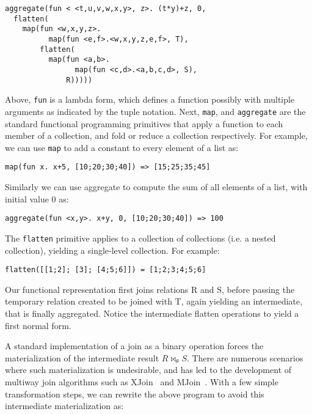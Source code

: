 \begin{verbatim}
aggregate(fun < <t,u,v,w,x,y>, z>. (t*y)+z, 0,
  flatten(
    map(fun <w,x,y,z>.
          map(fun <e,f>.<w,x,y,z,e,f>, T),
        flatten(
          map(fun <a,b>.
                map(fun <c,d>.<a,b,c,d>, S),
              R)))))
\end{verbatim}

\noindent Above, {\tt fun} is a lambda form, which defines a function possibly
with multiple arguments as indicated by the tuple notation. Next, {\tt map}, and
{\tt aggregate} are the standard functional programming primitives that apply a
function to each member of a collection, and fold or reduce a collection
respectively. For example, we can use {\tt map} to add a constant to every
element of a list as:

\vspace{-2mm}
\begin{verbatim}
map(fun x. x+5, [10;20;30;40]) => [15;25;35;45]
\end{verbatim}

\vspace{-2mm}
\noindent Similarly we can use aggregate to compute the sum of all elements of a
list, with initial value 0 as:

\vspace{-2mm}
\begin{verbatim}
aggregate(fun <x,y>. x+y, 0, [10;20;30;40]) => 100
\end{verbatim}

\vspace{-2mm}
\noindent The {\tt flatten} primitive applies to a
collection of collections (i.e. a nested collection), yielding a single-level
collection. For example:

\vspace{-2mm}
\begin{verbatim}
flatten([[1;2]; [3]; [4;5;6]]) = [1;2;3;4;5;6]
\end{verbatim}

\vspace{-1mm}
\noindent Our functional representation first joins relations R and S, before
passing the temporary relation created to be joined with T, again yielding an
intermediate, that is finally aggregated. Notice the intermediate flatten
operations to yield a first normal form.

A standard implementation of a join as a binary operation forces the
materialization of the intermediate result $R \bowtie_{\theta} S$. There are
numerous scenarios where such materialization is undesirable, and has led to the
development of multiway join algorithms such as XJoin~\cite{urhan-debull:00} and
MJoin~\cite{viglas-vldb:03}. With a few simple transformation steps, we can
rewrite the above program to avoid this intermediate materialization as:

